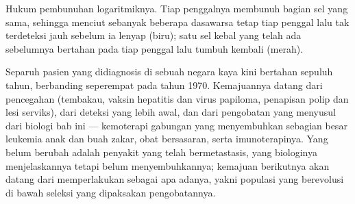 \begin{omfigure}

{\small Hukum pembunuhan logaritmiknya. Tiap penggalnya membunuh bagian sel
yang sama, sehingga  menciut sebanyak beberapa dasawarsa tetap tiap
penggal lalu tak terdeteksi jauh sebelum ia lenyap (biru); satu sel kebal yang
telah ada sebelumnya bertahan pada tiap penggal lalu tumbuh kembali (merah).}
\end{omfigure}

\begin{remark}\label{rem:b3:cancer-biology:changed}
Separuh pasien yang didiagnosis  di sebuah negara kaya kini
bertahan sepuluh tahun, berbanding seperempat pada tahun 1970. Kemajuannya
datang dari pencegahan (tembakau, vaksin hepatitis dan virus papiloma,
penapisan polip dan lesi serviks), dari deteksi yang lebih awal, dan dari
pengobatan yang menyusul dari biologi bab ini --- kemoterapi gabungan yang
menyembuhkan sebagian besar leukemia anak dan  buah zakar, obat
bersasaran, serta imunoterapinya. Yang belum berubah adalah penyakit yang
telah bermetastasis, yang biologinya menjelaskannya tetapi belum
menyembuhkannya; kemajuan berikutnya akan datang dari memperlakukan 
sebagai apa adanya, yakni populasi yang berevolusi di bawah seleksi yang
dipaksakan pengobatannya.
\end{remark}

